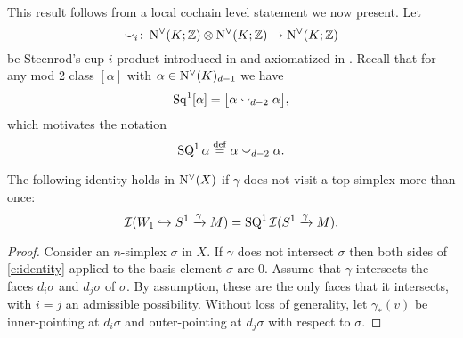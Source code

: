 This result follows from a local cochain level statement we now present.
Let
\[
\smallsmile_i \colon \operatorname{N^{\vee}}(K; \mathbb{Z}) \otimes \operatorname{N^{\vee}}(K; \mathbb{Z}) \to \operatorname{N^{\vee}}(K; \mathbb{Z})
\]
be Steenrod's cup-$i$ product introduced in \cite{steenrod1947products} and axiomatized in \cite{medina2022axiomatic}.
Recall that for any mod 2 class $[\alpha]$ with $\alpha \in \operatorname{N^{\vee}}(K)_{d-1}$ we have
\[
\operatorname{Sq}^1 [\alpha] = \big[ \alpha \smallsmile_{d-2} \alpha \big],
\]
which motivates the notation
\[
\operatorname{SQ}^1 \alpha \stackrel{\mathrm{def}}{=} \alpha \smallsmile_{d-2} \alpha.
\]
\begin{proposition}
	The following identity holds in $\operatorname{N^{\vee}}(X)$ if $\gamma$ does not visit a top simplex more than once:
	\begin{equation} \label{e:identity}
		\mathcal{I}(W_1 \hookrightarrow S^1 \xrightarrow{\gamma} M) = \operatorname{SQ}^1 \mathcal{I}(S^1 \xrightarrow{\gamma} M).
	\end{equation}
\end{proposition}

\begin{proof}
	Consider an $n$-simplex $\sigma$ in $X$.
	If $\gamma$ does not intersect $\sigma$ then both sides of \cref{e:identity} applied to the basis element $\sigma$ are $0$.
	Assume that $\gamma$ intersects the faces $d_i \sigma$ and $d_j \sigma$ of $\sigma$.
	By assumption, these are the only faces that it intersects, with $i = j$ an admissible possibility.
	Without loss of generality, let $\gamma_\ast(v)$ be inner-pointing at $d_i \sigma$ and outer-pointing at $d_j \sigma$ with respect to $\sigma$.
\end{proof}

%
%
%
